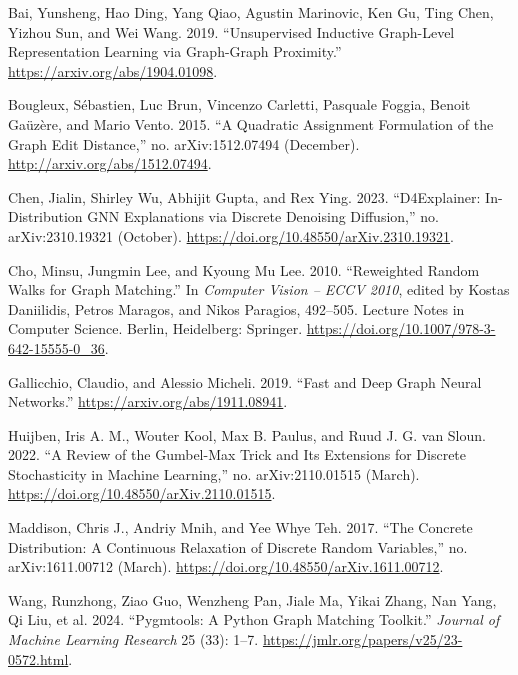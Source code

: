 \documentclass[
  11pt,
  letterpaper,
]{article}
\newlength{\cslhangindent}
\newlength{\cslentryspacingunit} %
\newenvironment{CSLReferences}[2] %
 {%
  \setlength{\parindent}{0pt}
  \ifodd #1
  \let\oldpar\par
  \def\par{\hangindent=\cslhangindent\oldpar}
  \fi
  \setlength{\parskip}{#2\cslentryspacingunit}
 }%
 {}
\begin{document}
\hypertarget{refs}{}
\begin{CSLReferences}{1}{0}
\leavevmode{}%
Bai, Yunsheng, Hao Ding, Yang Qiao, Agustin Marinovic, Ken Gu, Ting
Chen, Yizhou Sun, and Wei Wang. 2019. {``Unsupervised Inductive
Graph-Level Representation Learning via Graph-Graph Proximity.''}
\url{https://arxiv.org/abs/1904.01098}.

\leavevmode{}%
Bougleux, Sébastien, Luc Brun, Vincenzo Carletti, Pasquale Foggia,
Benoit Gaüzère, and Mario Vento. 2015. {``A Quadratic Assignment
Formulation of the Graph Edit Distance,''} no. arXiv:1512.07494
(December). \url{http://arxiv.org/abs/1512.07494}.

\leavevmode{}%
Chen, Jialin, Shirley Wu, Abhijit Gupta, and Rex Ying. 2023.
{``D4Explainer: In-Distribution GNN Explanations via Discrete Denoising
Diffusion,''} no. arXiv:2310.19321 (October).
\url{https://doi.org/10.48550/arXiv.2310.19321}.

\leavevmode{}%
Cho, Minsu, Jungmin Lee, and Kyoung Mu Lee. 2010. {``Reweighted Random
Walks for Graph Matching.''} In \emph{Computer Vision -- ECCV 2010},
edited by Kostas Daniilidis, Petros Maragos, and Nikos Paragios,
492--505. Lecture Notes in Computer Science. Berlin, Heidelberg:
Springer. \url{https://doi.org/10.1007/978-3-642-15555-0_36}.

\leavevmode{}%
Gallicchio, Claudio, and Alessio Micheli. 2019. {``Fast and Deep Graph
Neural Networks.''} \url{https://arxiv.org/abs/1911.08941}.

\leavevmode{}%
Huijben, Iris A. M., Wouter Kool, Max B. Paulus, and Ruud J. G. van
Sloun. 2022. {``A Review of the Gumbel-Max Trick and Its Extensions for
Discrete Stochasticity in Machine Learning,''} no. arXiv:2110.01515
(March). \url{https://doi.org/10.48550/arXiv.2110.01515}.

\leavevmode{}%
Maddison, Chris J., Andriy Mnih, and Yee Whye Teh. 2017. {``The Concrete
Distribution: A Continuous Relaxation of Discrete Random Variables,''}
no. arXiv:1611.00712 (March).
\url{https://doi.org/10.48550/arXiv.1611.00712}.

\leavevmode{}%
Wang, Runzhong, Ziao Guo, Wenzheng Pan, Jiale Ma, Yikai Zhang, Nan Yang,
Qi Liu, et al. 2024. {``Pygmtools: A Python Graph Matching Toolkit.''}
\emph{Journal of Machine Learning Research} 25 (33): 1--7.
\url{https://jmlr.org/papers/v25/23-0572.html}.


\end{CSLReferences}
\end{document}
